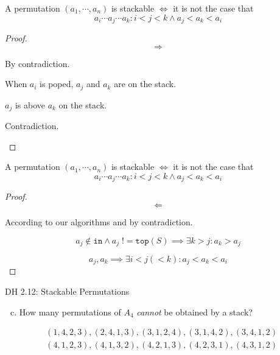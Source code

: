 \begin{frame}{}
  \begin{theorem}
    A permutation $(a_1, \cdots, a_n)$ is stackable  $\iff$ it is not the case that
    \[
      a_i \cdots a_j \cdots a_k: i < j < k \land a_j < a_k < a_i
    \]
  \end{theorem}

  \begin{proof}
    \[
      \Longrightarrow
    \]
    \centerline{By contradiction.}
    \begin{description}[$a_j < a_k < a_i$:]
      \item[$a_j < a_k < a_i$:] When $a_i$ is poped, $a_j$ and $a_k$ are on the stack.
      \item[$j < k$:] $a_j$ is above $a_k$ on the stack.
      \item[$a_j < a_k$:] Contradiction.
    \end{description}
  \end{proof}
\end{frame}

\begin{frame}{}
  \begin{theorem}
    A permutation $(a_1, \cdots, a_n)$ is stackable  $\iff$ it is not the case that
    \[
      a_i \cdots a_j \cdots a_k: i < j < k \land a_j < a_k < a_i
    \]
  \end{theorem}

  \begin{proof}
    \[
      \Longleftarrow
    \]
    \centerline{According to our algorithms and by contradiction.}

    \[
      a_j \notin \texttt{in} \land a_j \;!\!= \texttt{top}(S) \implies \exists k > j: a_k > a_j
    \]

    \[
      a_j, a_k \implies \exists i < j (< k): a_j < a_k < a_i
    \]
  \end{proof}
\end{frame}

\begin{frame}{}
  \begin{exampleblock}{DH 2.12: Stackable Permutations}
    \begin{enumerate}[(a)]
      \setcounter{enumi}{2}
      \item How many permutations of $A_4$ \emph{cannot} be obtained by a stack?
    \end{enumerate}
  \end{exampleblock}

  \begin{align*}
    &(1, 4, 2, 3), (2, 4, 1, 3), (3, 1, 2, 4), (3, 1, 4, 2), (3, 4, 1, 2) \\
    &(4, 1, 2, 3), (4, 1, 3, 2), (4, 2, 1, 3), (4, 2, 3, 1), (4, 3, 1, 2)
  \end{align*}
\end{frame}

